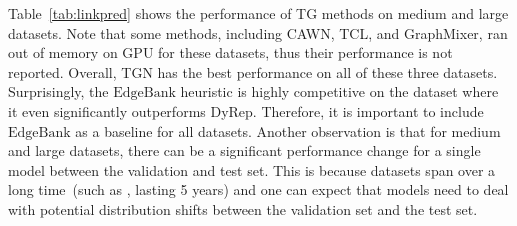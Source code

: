     





Table~\ref{tab:linkpred} shows the performance of TG methods on medium and large \name datasets. Note that some methods, including CAWN, TCL, and GraphMixer, ran out of memory on GPU for these datasets, thus their performance is not reported. Overall, TGN has the best performance on all of these three datasets. Surprisingly, the $\text{EdgeBank}$ heuristic is highly competitive on the \coin dataset where it even significantly outperforms DyRep. Therefore, it is important to include $\text{EdgeBank}$ as a baseline for all datasets. 
Another observation is that for medium and large \name datasets, there can be a significant performance change for a single model between the validation and test set. This is because \name datasets span over a long time~(such as \reddit, lasting 5 years) and one can expect that models need to deal with potential distribution shifts between the validation set and the test set. 

